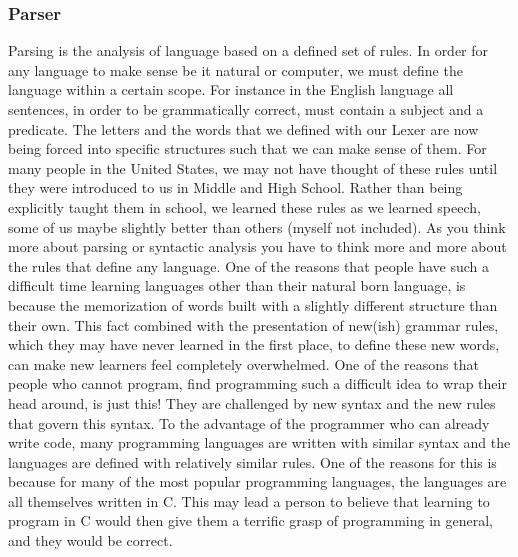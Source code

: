 \documentclass[sigconf]{acmart}
\begin{document}
\subsubsection{Parser} 
\newline
Parsing is the analysis of language based on a defined set of rules. In order for any language to make sense be it natural or computer, we must define the language within a certain scope. For instance in the English language all sentences, in order to be grammatically correct, must contain a subject and a predicate. The letters and the words that we defined with our Lexer are now being forced into specific structures such that we can make sense of them. For many people in the United States, we may not have thought of these rules until they were introduced to us in Middle and High School. Rather than being explicitly taught them in school, we learned these rules as we learned speech, some of us maybe slightly better than others (myself not included). As you think more about parsing or syntactic analysis you have to think more and more about the rules that define any language. One of the reasons that people have such a difficult time learning languages other than their natural born language, is because the memorization of words built with a slightly different structure than their own. This fact combined with the presentation of new(ish) grammar rules, which they may have never learned in the first place, to define these new words, can make new learners feel completely overwhelmed. One of the reasons that people who cannot program, find programming such a difficult idea to wrap their head around, is just this! They are challenged by new syntax and the new rules that govern this syntax. To the advantage of the programmer who can already write code, many programming languages are written with similar syntax and the languages are defined with relatively similar rules. One of the reasons for this is because for many of the most popular programming languages, the languages are all themselves written in C. This may lead a person to believe that learning to program in C would then give them a terrific grasp of programming in general, and they would be correct.
\newline
\end{document}
